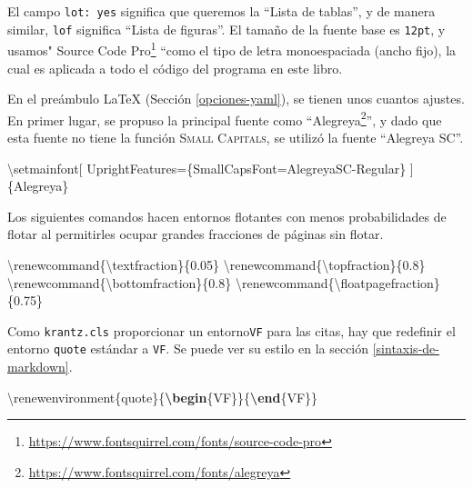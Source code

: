 \documentclass[12pt,]{krantz}
\makeatletter
\newenvironment{Shaded}{\begin{snugshade}}{\end{snugshade}}
\newcommand{\KeywordTok}[1]{\textcolor[rgb]{0.13,0.29,0.53}{\textbf{#1}}}
\newcommand{\FunctionTok}[1]{\textcolor[rgb]{0.00,0.00,0.00}{#1}}
\newcommand{\ExtensionTok}[1]{#1}
\newcommand{\NormalTok}[1]{#1}
\renewcommand{\href}[2]{#2\footnote{\url{#1}}}
\newenvironment{kframe}{%
\medskip{}
\setlength{\fboxsep}{.8em}
 \def\at@end@of@kframe{}%
 \ifinner\ifhmode%
  \def\at@end@of@kframe{\end{minipage}}%
  \begin{minipage}{\columnwidth}%
 \fi\fi%
 \def\FrameCommand##1{\hskip\@totalleftmargin \hskip-\fboxsep
 \colorbox{shadecolor}{##1}\hskip-\fboxsep
     \hskip-\linewidth \hskip-\@totalleftmargin \hskip\columnwidth}%
 \MakeFramed {\advance\hsize-\width
   \@totalleftmargin\z@ \linewidth\hsize
   \@setminipage}}%
 {\par\unskip\endMakeFramed%
 \at@end@of@kframe}
\renewenvironment{Shaded}{\begin{kframe}}{\end{kframe}}
\theoremstyle{definition}
\theoremstyle{definition}
\theoremstyle{definition}
\theoremstyle{remark}
\makeatother
\begin{document}
El campo \texttt{lot:\ yes} significa que queremos la ``Lista de
tablas'', y de manera similar, \texttt{lof} significa ``Lista de
figuras''. El tamaño de la fuente base es \texttt{12pt}, y usamos"
\href{https://www.fontsquirrel.com/fonts/source-code-pro}{Source Code
Pro} ``como el tipo de letra monoespaciada (ancho fijo), la cual es
aplicada a todo el código del programa en este libro.

En el preámbulo LaTeX (Sección \ref{opciones-yaml}), se tienen unos
cuantos ajustes. En primer lugar, se propuso la principal fuente
 como
``\href{https://www.fontsquirrel.com/fonts/alegreya}{Alegreya}'', y dado
que esta fuente no tiene la función \textsc{Small Capitals}, se utilizó
la fuente ``Alegreya SC''.

\begin{Shaded}
\begin{Highlighting}[]
\FunctionTok{\textbackslash{}setmainfont}\NormalTok{[}
\NormalTok{  UprightFeatures=\{SmallCapsFont=AlegreyaSC-Regular\}}
\NormalTok{]\{Alegreya\}}
\end{Highlighting}
\end{Shaded}

Los siguientes comandos hacen entornos flotantes
 con menos probabilidades de flotar al
permitirles ocupar grandes fracciones de páginas sin flotar.

\begin{Shaded}
\begin{Highlighting}[]
\FunctionTok{\textbackslash{}renewcommand}\NormalTok{\{}\ExtensionTok{\textbackslash{}textfraction}\NormalTok{\}\{0.05\}}
\FunctionTok{\textbackslash{}renewcommand}\NormalTok{\{}\ExtensionTok{\textbackslash{}topfraction}\NormalTok{\}\{0.8\}}
\FunctionTok{\textbackslash{}renewcommand}\NormalTok{\{}\ExtensionTok{\textbackslash{}bottomfraction}\NormalTok{\}\{0.8\}}
\FunctionTok{\textbackslash{}renewcommand}\NormalTok{\{}\ExtensionTok{\textbackslash{}floatpagefraction}\NormalTok{\}\{0.75\}}
\end{Highlighting}
\end{Shaded}

Como \texttt{krantz.cls} proporcionar un entorno\texttt{VF} para las
citas, hay que redefinir el entorno \texttt{quote} estándar a
\texttt{VF}. Se puede ver su estilo en la sección
\ref{sintaxis-de-markdown}.

\begin{Shaded}
\begin{Highlighting}[]
\FunctionTok{\textbackslash{}renewenvironment}\NormalTok{\{quote\}\{}\KeywordTok{\textbackslash{}begin}\NormalTok{\{}\ExtensionTok{VF}\NormalTok{\}\}\{}\KeywordTok{\textbackslash{}end}\NormalTok{\{}\ExtensionTok{VF}\NormalTok{\}\}}
\end{Highlighting}
\end{Shaded}
\end{document}

